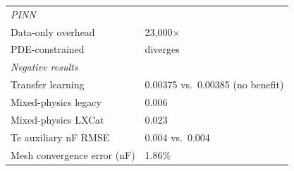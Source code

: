 \documentclass[12pt,a4paper]{article}
\begin{document}
\begin{center}
\begin{tabular}{l l}
\hline
\multicolumn{2}{l}{\emph{PINN}} \\
Data-only overhead & 23,000$\times$ \\
PDE-constrained & diverges \\
\hline
\multicolumn{2}{l}{\emph{Negative results}} \\
Transfer learning & 0.00375 vs.\ 0.00385 (no benefit) \\
Mixed-physics legacy & 0.006 \\
Mixed-physics LXCat & 0.023 \\
Te auxiliary nF RMSE & 0.004 vs.\ 0.004 \\
\hline
Mesh convergence error (nF) & 1.86\% \\
\hline
\end{tabular}
\end{center}
\end{document}
